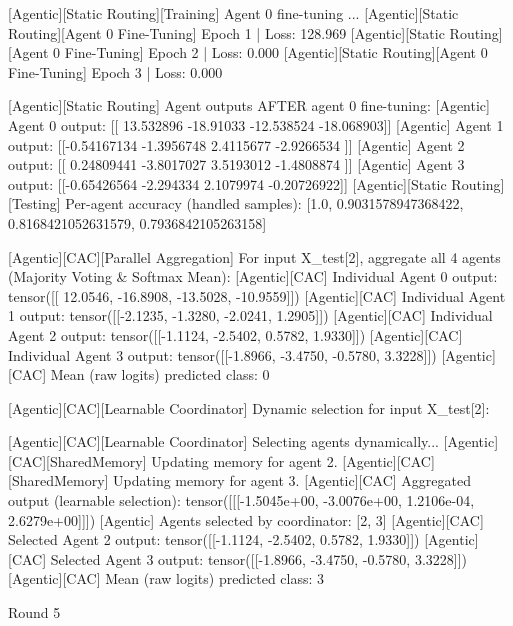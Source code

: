 [Agentic][Static Routing][Training] Agent 0 fine-tuning ...
[Agentic][Static Routing][Agent 0 Fine-Tuning] Epoch 1 | Loss: 128.969
[Agentic][Static Routing][Agent 0 Fine-Tuning] Epoch 2 | Loss: 0.000
[Agentic][Static Routing][Agent 0 Fine-Tuning] Epoch 3 | Loss: 0.000

[Agentic][Static Routing] Agent outputs AFTER agent 0 fine-tuning:
[Agentic] Agent 0 output: [[ 13.532896 -18.91033  -12.538524 -18.068903]]
[Agentic] Agent 1 output: [[-0.54167134 -1.3956748   2.4115677  -2.9266534 ]]
[Agentic] Agent 2 output: [[ 0.24809441 -3.8017027   3.5193012  -1.4808874 ]]
[Agentic] Agent 3 output: [[-0.65426564 -2.294334    2.1079974  -0.20726922]]
[Agentic][Static Routing][Testing] Per-agent accuracy (handled samples): [1.0, 0.9031578947368422, 0.8168421052631579, 0.7936842105263158]

[Agentic][CAC][Parallel Aggregation] For input X_test[2], aggregate all 4 agents (Majority Voting & Softmax Mean):
[Agentic][CAC] Individual Agent 0 output: tensor([[ 12.0546, -16.8908, -13.5028, -10.9559]])
[Agentic][CAC] Individual Agent 1 output: tensor([[-2.1235, -1.3280, -2.0241,  1.2905]])
[Agentic][CAC] Individual Agent 2 output: tensor([[-1.1124, -2.5402,  0.5782,  1.9330]])
[Agentic][CAC] Individual Agent 3 output: tensor([[-1.8966, -3.4750, -0.5780,  3.3228]])
[Agentic][CAC] Mean (raw logits) predicted class: 0

[Agentic][CAC][Learnable Coordinator] Dynamic selection for input X_test[2]:

[Agentic][CAC][Learnable Coordinator] Selecting agents dynamically...
[Agentic][CAC][SharedMemory] Updating memory for agent 2.
[Agentic][CAC][SharedMemory] Updating memory for agent 3.
[Agentic][CAC] Aggregated output (learnable selection): tensor([[[-1.5045e+00, -3.0076e+00,  1.2106e-04,  2.6279e+00]]])
[Agentic] Agents selected by coordinator: [2, 3]
[Agentic][CAC] Selected Agent 2 output: tensor([[-1.1124, -2.5402,  0.5782,  1.9330]])
[Agentic][CAC] Selected Agent 3 output: tensor([[-1.8966, -3.4750, -0.5780,  3.3228]])
[Agentic][CAC] Mean (raw logits) predicted class: 3

Round 5

